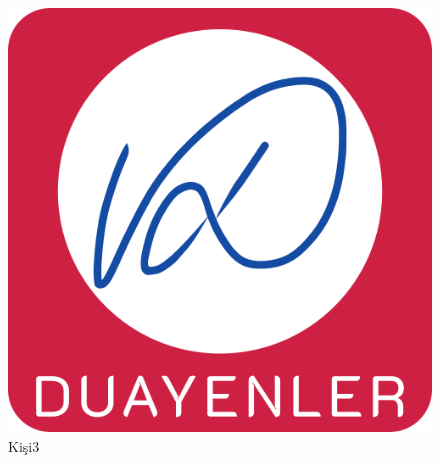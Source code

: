 \begin{minipage}{0.28\textwidth}
\begin{flushleft} 

\begin{figure}[H]
\center
\setlength{\unitlength}{\textwidth} 
\includegraphics[width=0.7\unitlength]{images/logo1}
\caption{\label{fig:kisi3}Kişi3 }
\end{figure}


\end{flushleft}
\end{minipage}
\begin{minipage}{0.8\textwidth}
\begin{flushright} 

\blindtext

\end{flushright}
\end{minipage}\\[0.8cm]



